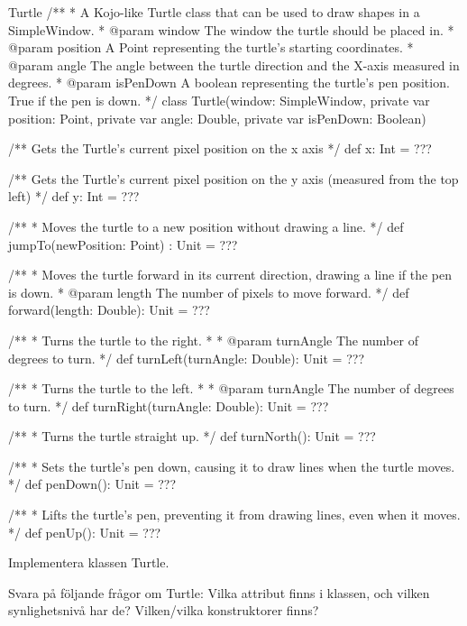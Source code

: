 \begin{ScalaSpec}{Turtle}
/**
  * A Kojo-like Turtle class that can be used to draw shapes
    in a SimpleWindow.
  * @param window     The window the turtle should be placed in.
  * @param position   A Point representing the turtle's starting
                      coordinates.
  * @param angle      The angle between the turtle direction and
                      the X-axis measured in degrees.
  * @param isPenDown  A boolean representing the turtle's pen
                      position. True if the pen is down.
  */
class Turtle(window: SimpleWindow, private var position: Point,
      private var angle: Double, private var isPenDown: Boolean) {

  /** Gets the Turtle's current pixel position on the x axis */
  def x: Int = ???

  /** Gets the Turtle's current pixel position on the y axis
      (measured from the top left) */
  def y: Int = ???

  /**
    * Moves the turtle to a new position without drawing a line.
    */
  def jumpTo(newPosition: Point) : Unit = ???

  /**
    * Moves the turtle forward in its current direction, drawing
      a line if the pen is down.
    * @param length The number of pixels to move forward.
    */
  def forward(length: Double): Unit = ???

  /**
    * Turns the turtle to the right.
    *
    * @param turnAngle The number of degrees to turn.
    */
  def turnLeft(turnAngle: Double): Unit = ???

  /**
    * Turns the turtle to the left.
    *
    * @param turnAngle The number of degrees to turn.
    */
  def turnRight(turnAngle: Double): Unit = ???

  /**
    * Turns the turtle straight up.
    */
  def turnNorth(): Unit = ???

  /**
    * Sets the turtle's pen down, causing it to draw lines when
      the turtle moves.
    */
  def penDown(): Unit = ???

  /**
    * Lifts the turtle's pen, preventing it from drawing lines,
      even when it moves.
    */
  def penUp(): Unit = ???
}

\end{ScalaSpec}

\Subtask Implementera klassen Turtle.

\Subtask Svara på följande frågor om Turtle: Vilka attribut finns i klassen, och vilken synlighetsnivå har de? Vilken/vilka konstruktorer finns? 

